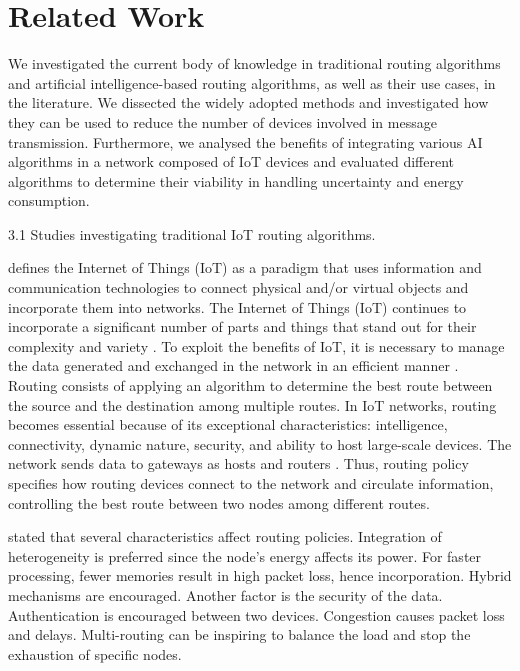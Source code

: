 \section{Related Work}
\label{sec:rel-work}


We investigated the current body of knowledge in traditional routing algorithms and artificial intelligence-based routing 
algorithms, as well as their use cases, in the literature. We dissected the widely adopted methods and investigated how they
can be used to reduce the number of devices involved in message transmission. Furthermore, we analysed the benefits of 
integrating various AI algorithms in a network composed of IoT devices and evaluated different algorithms to determine their 
viability in handling uncertainty and energy consumption.

3.1 Studies investigating traditional IoT routing algorithms.

\cite{plageras-psannis:2017} defines the Internet of Things (IoT) as a paradigm that uses information and communication 
technologies to connect physical and/or virtual objects and incorporate them into networks. The Internet of Things (IoT) 
continues to incorporate a significant number of parts and things that stand out for their complexity and variety 
\cite{amrioui-Sofiane-Hamrioui-Camil-Lloret-Jaime-Lorenz-Pascal:2018}. To exploit the benefits of IoT, it is necessary to manage 
the data generated and exchanged in the network in an efficient manner \cite{Tlili-Sihem-Mnasri-Sami-Val-hierry:2022}. 
Routing consists of applying an algorithm to determine the best route between the source and 
the destination among multiple routes. In IoT networks, routing becomes essential because of its exceptional characteristics: 
intelligence, connectivity, dynamic nature, security, and ability to host large-scale devices. The network sends data to gateways 
as hosts and routers \cite{AlZubi-Al-Maitah-Alarifi:2019}. Thus, routing policy specifies how routing devices connect to 
the network and circulate information, controlling the best route between two nodes among different routes. 

 \cite{Tlili-Sihem-Mnasri-Sami-Val-hierry:2022} stated that several characteristics affect routing policies. Integration of heterogeneity is 
 preferred since the node’s energy affects its power. For faster processing, fewer memories result in high packet loss, 
 hence incorporation. Hybrid mechanisms are encouraged. Another factor is the security of the data. Authentication is 
 encouraged between two devices. Congestion causes packet loss and delays. Multi-routing can be inspiring to balance the 
 load and stop the exhaustion of specific nodes. 
 
